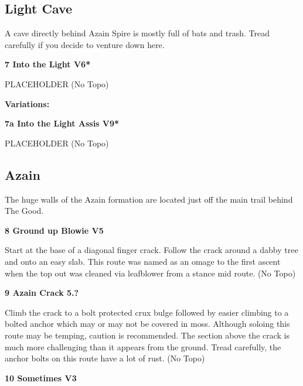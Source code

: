 \begin{multicols}{2}
			\subsection*{Light Cave}\label{bf:Light Cave}
			A cave directly behind Azain Spire is mostly full of bats and trash. Tread carefully if you decide to venture down here.\\
			
					\label{rt:Into the Light}
\colorbox{RoyalBlue!20}{
\parbox{0.95\linewidth}{
\textbf{
7 Into the Light V6*  
}
}
}

					\begin{adjustwidth}{0.5cm}{}				
					PLACEHOLDER
						\newline (No Topo) 
					\end{adjustwidth}
						\begin{adjustwidth}{0.5cm}{}				
						\textbf{Variations:} \newline
							\label{vr:Into the Light Assis}
\colorbox{Goldenrod!50}{
\parbox{0.95\linewidth}{
\textbf{
7a Into the Light Assis V9*  
}
}
}

							\begin{adjustwidth}{0.5cm}{}				
							PLACEHOLDER
								\newline (No Topo) 
							\end{adjustwidth}
						\end{adjustwidth}
			\subsection*{Azain}\label{bf:Azain}
			The huge walls of the Azain formation are located just off the main trail behind The Good.\\
			
					\label{rt:Ground up Blowie}
\colorbox{RoyalBlue!20}{
\parbox{0.95\linewidth}{
\textbf{
8 Ground up Blowie V5  
}
}
}

					\begin{adjustwidth}{0.5cm}{}				
					Start at the base of a diagonal finger crack. Follow the crack around a dabby tree and onto an easy slab. This route was named as an omage to the first ascent when the top out was cleaned via leafblower from a stance mid route.
						\newline (No Topo) 
					\end{adjustwidth}
					\label{rt:Azain Crack}
\colorbox{black!20}{
\parbox{0.95\linewidth}{
\textbf{
9 Azain Crack 5.?  
}
}
}

					\begin{adjustwidth}{0.5cm}{}				
					Climb the crack to a bolt protected crux bulge followed by easier climbing to a bolted anchor which may or may not be covered in moss. Although soloing this route may be temping, caution is recommended. The section above the crack is much more challenging than it appears from the ground. Tread carefully, the anchor bolts on this route have a lot of rust.
						\newline (No Topo) 
					\end{adjustwidth}
					\label{rt:Sometimes}
\colorbox{green!20}{
\parbox{0.95\linewidth}{
\textbf{
10 Sometimes V3  
}
}
}


\end{multicols}
